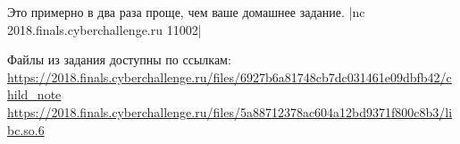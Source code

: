 
Это примерно в два раза проще, чем ваше домашнее задание.
|nc 2018.finals.cyberchallenge.ru 11002|
 
Файлы из задания доступны по ссылкам:\\
\url{https://2018.finals.cyberchallenge.ru/files/6927b6a81748cb7dc031461e09dbfb42/child_note}\\
\url{https://2018.finals.cyberchallenge.ru/files/5a88712378ac604a12bd9371f800c8b3/libc.so.6}
 
\solutionSection


